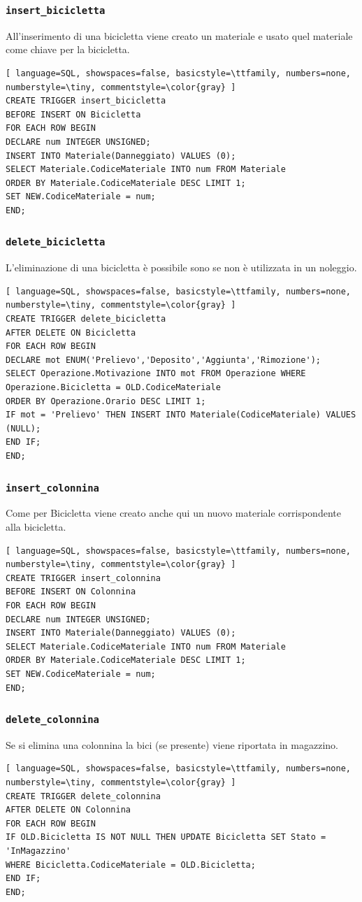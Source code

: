 \documentclass[a4paper,twoside]{article}
\begin{document}
\subsubsection{\texttt{insert\_bicicletta}}
All'inserimento di una bicicletta viene creato un materiale e usato quel materiale come chiave per la bicicletta.
\begin{lstlisting}[ language=SQL, showspaces=false, basicstyle=\ttfamily, numbers=none, numberstyle=\tiny, commentstyle=\color{gray} ]
CREATE TRIGGER insert_bicicletta
BEFORE INSERT ON Bicicletta
FOR EACH ROW BEGIN
DECLARE num INTEGER UNSIGNED;
INSERT INTO Materiale(Danneggiato) VALUES (0);
SELECT Materiale.CodiceMateriale INTO num FROM Materiale
ORDER BY Materiale.CodiceMateriale DESC LIMIT 1;
SET NEW.CodiceMateriale = num;
END;
\end{lstlisting}
\subsubsection{\texttt{delete\_bicicletta}}
L'eliminazione di una bicicletta è possibile sono se non è utilizzata in un noleggio.
\begin{lstlisting}[ language=SQL, showspaces=false, basicstyle=\ttfamily, numbers=none, numberstyle=\tiny, commentstyle=\color{gray} ]
CREATE TRIGGER delete_bicicletta
AFTER DELETE ON Bicicletta
FOR EACH ROW BEGIN
DECLARE mot ENUM('Prelievo','Deposito','Aggiunta','Rimozione');
SELECT Operazione.Motivazione INTO mot FROM Operazione WHERE Operazione.Bicicletta = OLD.CodiceMateriale
ORDER BY Operazione.Orario DESC LIMIT 1;
IF mot = 'Prelievo' THEN INSERT INTO Materiale(CodiceMateriale) VALUES (NULL);
END IF;
END;
\end{lstlisting}
\subsubsection{\texttt{insert\_colonnina}}
Come per Bicicletta viene creato anche qui un nuovo materiale corrispondente alla bicicletta.
\begin{lstlisting}[ language=SQL, showspaces=false, basicstyle=\ttfamily, numbers=none, numberstyle=\tiny, commentstyle=\color{gray} ]
CREATE TRIGGER insert_colonnina
BEFORE INSERT ON Colonnina
FOR EACH ROW BEGIN
DECLARE num INTEGER UNSIGNED;
INSERT INTO Materiale(Danneggiato) VALUES (0);
SELECT Materiale.CodiceMateriale INTO num FROM Materiale
ORDER BY Materiale.CodiceMateriale DESC LIMIT 1;
SET NEW.CodiceMateriale = num;
END;
\end{lstlisting}
\subsubsection{\texttt{delete\_colonnina}}
Se si elimina una colonnina la bici (se presente) viene riportata in magazzino.
\begin{lstlisting}[ language=SQL, showspaces=false, basicstyle=\ttfamily, numbers=none, numberstyle=\tiny, commentstyle=\color{gray} ]
CREATE TRIGGER delete_colonnina
AFTER DELETE ON Colonnina
FOR EACH ROW BEGIN
IF OLD.Bicicletta IS NOT NULL THEN UPDATE Bicicletta SET Stato = 'InMagazzino'
WHERE Bicicletta.CodiceMateriale = OLD.Bicicletta;
END IF;
END;
\end{lstlisting}
\end{document}

